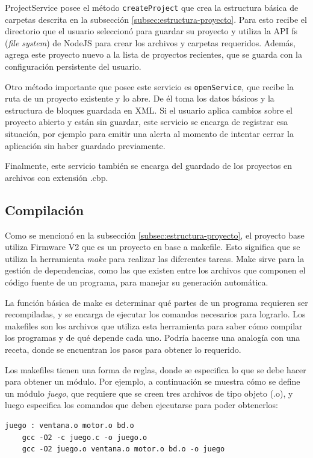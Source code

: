 ProjectService posee el método \texttt{createProject} que crea la estructura básica de carpetas descrita en la subsección \ref{subsec:estructura-proyecto}. Para esto recibe el directorio que el usuario seleccionó para guardar su proyecto y utiliza la API fs (\emph{file system}) de NodeJS para crear los archivos y carpetas requeridos. Además, agrega este proyecto nuevo a la lista de proyectos recientes, que se guarda con la configuración persistente del usuario.

Otro método importante que posee este servicio es \texttt{openService}, que recibe la ruta de un proyecto existente y lo abre. De él toma los datos básicos y la estructura de bloques guardada en XML. Si el usuario aplica cambios sobre el proyecto abierto y están sin guardar, este servicio se encarga de registrar esa situación, por ejemplo para emitir una alerta al momento de intentar cerrar la aplicación sin haber guardado previamente.

Finalmente, este servicio también se encarga del guardado de los proyectos en archivos con extensión .cbp.

\subsection{Compilación}
Como se mencionó en la subsección \ref{subsec:estructura-proyecto}, el proyecto base utiliza Firmware V2 que es un proyecto en base a makefile. Esto significa que se utiliza la herramienta \emph{make} para realizar las diferentes tareas. Make sirve para la gestión de dependencias, como las que existen entre los archivos que componen el código fuente de un programa, para manejar su generación automática.

La función básica de make es determinar qué partes de un programa requieren ser recompiladas, y se encarga de ejecutar los comandos necesarios para lograrlo. Los makefiles son los archivos que utiliza esta herramienta para saber cómo compilar los programas y de qué depende cada uno. Podría hacerse una analogía con una receta, donde se encuentran los pasos para obtener lo requerido.

Los makefiles tienen una forma de reglas, donde se especifica lo que se debe hacer para obtener un módulo. Por ejemplo, a continuación se muestra cómo se define un módulo \emph{juego}, que requiere que se creen tres archivos de tipo objeto (.o), y luego especifica los comandos que deben ejecutarse para poder obtenerlos:

\begin{lstlisting}[caption=Ejemplo de un objetivo en makefile]
juego : ventana.o motor.o bd.o
    gcc -O2 -c juego.c -o juego.o
    gcc -O2 juego.o ventana.o motor.o bd.o -o juego
\end{lstlisting}

